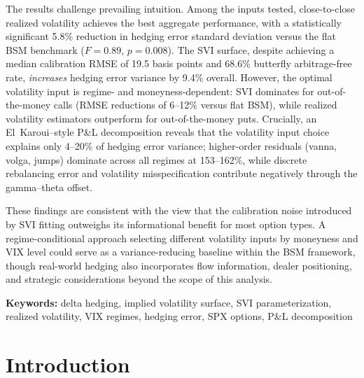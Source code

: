 \documentclass[12pt, letterpaper]{article}
\begin{document}
The results challenge prevailing intuition. Among the inputs tested, close-to-close realized volatility achieves the best aggregate performance, with a statistically significant 5.8\% reduction in hedging error standard deviation versus the flat BSM benchmark ($F = 0.89$, $p = 0.008$). The SVI surface, despite achieving a median calibration RMSE of 19.5 basis points and 68.6\% butterfly arbitrage-free rate, \textit{increases} hedging error variance by 9.4\% overall. However, the optimal volatility input is regime- and moneyness-dependent: SVI dominates for out-of-the-money calls (RMSE reductions of 6--12\% versus flat BSM), while realized volatility estimators outperform for out-of-the-money puts. Crucially, an El~Karoui--style P\&L decomposition reveals that the volatility input choice explains only 4--20\% of hedging error variance; higher-order residuals (vanna, volga, jumps) dominate across all regimes at 153--162\%, while discrete rebalancing error and volatility misspecification contribute negatively through the gamma--theta offset.

These findings are consistent with the view that the calibration noise introduced by SVI fitting outweighs its informational benefit for most option types. A regime-conditional approach selecting different volatility inputs by moneyness and VIX level could serve as a variance-reducing baseline within the BSM framework, though real-world hedging also incorporates flow information, dealer positioning, and strategic considerations beyond the scope of this analysis.

\vspace{0.5cm}
\noindent\textbf{Keywords:} delta hedging, implied volatility surface, SVI parameterization, realized volatility, VIX regimes, hedging error, SPX options, P\&L decomposition

\vspace{0.3cm}

\newpage
\tableofcontents
\newpage
\listoftables
\listoffigures
\newpage

\section{Introduction}
\label{sec:introduction}
\end{document}
